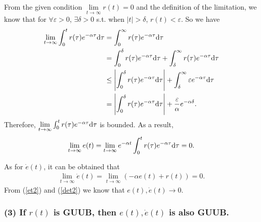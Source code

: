 \documentclass[12pt,a4paper]{article}
\begin{document}
\indent From the given condition $\lim\limits_{t\to\infty}r(t)=0$ and the definition of the limitation, we know that for $\forall \varepsilon >0$, $\exists \delta >0$ s.t. when $|t|>\delta$, $r(t)<\varepsilon$. So we have
\begin{equation}
\begin{aligned}
\lim\limits_{t\to\infty} \int_0^t r(\tau)e^{-\alpha\tau}{\rm d}\tau
    &= \int_0^\infty r(\tau)e^{-\alpha\tau}{\rm d}\tau \\
    &= \int_0^\delta r(\tau)e^{-\alpha\tau}{\rm d}\tau + \int_\delta^\infty r(\tau)e^{-\alpha\tau}{\rm d}\tau \\
    &\le \left|\int_0^\delta r(\tau)e^{-\alpha\tau}{\rm d}\tau\right|+\int_\delta^\infty \varepsilon e^{-\alpha\tau}{\rm d}\tau \\
    &= \left|\int_0^\delta r(\tau)e^{-\alpha\tau}{\rm d}\tau\right|+ \frac{\varepsilon}{\alpha}e^{-\alpha\delta}
    .
\end{aligned}
\end{equation}
Therefore, $\lim\limits_{t\to\infty} \int_0^t r(\tau)e^{-\alpha\tau}{\rm d}\tau$ is bounded. As a result,
\begin{equation}
\begin{aligned}
\lim\limits_{t\to\infty}e(t)
    = \lim\limits_{t\to\infty} e^{-\alpha t} \int_0^t r(\tau)e^{-\alpha\tau}{\rm d}\tau =0
    .
\end{aligned}
\label{et2}
\end{equation}

\indent As for $\dot{e}(t)$, it can be obtained that
\begin{equation}
\begin{aligned}
\lim\limits_{t\to\infty}\dot{e}(t)
    = \lim\limits_{t\to\infty} \left(-\alpha e(t)+r(t)\right) = 0
    .
\end{aligned}
\label{det2}
\end{equation}
From (\ref{et2}) and (\ref{det2}) we know that $e(t), \dot{e}(t)\rightarrow 0$.

\subsubsection*{(3) If $r(t)$ is GUUB, then $e(t), \dot{e}(t)$ is also GUUB.}
\end{document}
